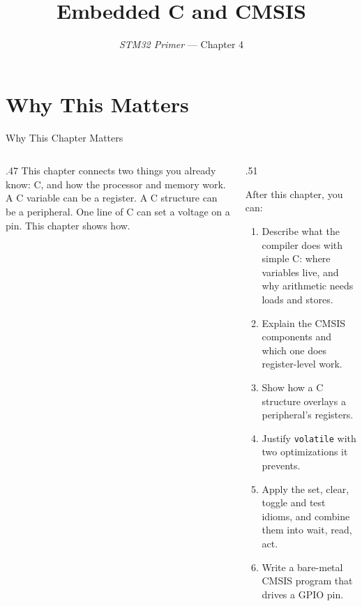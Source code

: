 \documentclass[9pt,aspectratio=169,xcolor=table]{beamer}
\title{Embedded C and CMSIS}
\subtitle{\emph{STM32 Primer} --- Chapter 4}
\begin{document}
\titlepage

\section{Why This Matters}

\begin{frame}{Why This Chapter Matters}
    \begin{columns}[c]
    \begin{column}{.47\textwidth}
        {\normalsize This chapter connects two things you already know: C, and how the processor and memory work. A C variable can be a register. A C structure can be a peripheral. One line of C can set a voltage on a pin. This chapter shows how.}
    \end{column}
    \begin{column}{.51\textwidth}
        \begin{block}{After this chapter, you can:}
        {\small
        \begin{enumerate}\itemsep2pt
            \item Describe what the compiler does with simple C: where variables live, and why arithmetic needs loads and stores.
            \item Explain the CMSIS components and which one does register-level work.
            \item Show how a C structure overlays a peripheral's registers.
            \item Justify \texttt{volatile} with two optimizations it prevents.
            \item Apply the set, clear, toggle and test idioms, and combine them into wait, read, act.
            \item Write a bare-metal CMSIS program that drives a GPIO pin.
        \end{enumerate}}
        \end{block}
    \end{column}
    \end{columns}
\end{frame}
\end{document}
